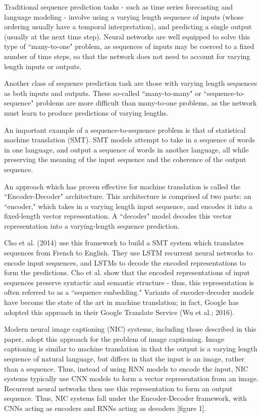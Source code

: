 \documentclass[letterpaper, 10 pt, conference]{ieeeconf}
\begin{document}
Traditional sequence prediction tasks - such as time series forecasting and language modeling - involve using a varying length sequence of inputs (whose ordering usually have a temporal interpretation), and predicting a single output (usually at the next time step). Neural networks are well equipped to solve this type of ``many-to-one" problem, as sequences of inputs may be coerced to a fixed number of time steps, so that the network does not need to account for varying length inputs or outputs.

Another class of sequence prediction task are those with varying length sequences as both inputs and outputs. These so-called ``many-to-many" or ``sequence-to-sequence" problems are more difficult than many-to-one problems, as the network must learn to produce predictions of varying lengths.

An important example of a sequence-to-sequence problem is that of statistical machine translation (SMT). SMT models attempt to take in a sequence of words in one language, and output a sequence of words in another language, all while preserving the meaning of the input sequence and the coherence of the output sequence.


An approach which has proven effective for machine translation is called the ``Encoder-Decoder" architecture. This architecture is comprised of two parts: an ``encoder," which takes in a varying length input sequence, and encodes it into a fixed-length vector representation. A ``decoder" model decodes this vector representation into a varying-length sequence prediction. 

Cho et al. (2014) use this framework to build a SMT system which translates sequences from French to English. They use LSTM recurrent neural networks to encode input sequences, and LSTMs to decode the encoded representations to form the predictions. Cho et al. show that the encoded representations of input sequences preserve syntactic and semantic structure - thus, this representation is often referred to as a ``sequence embedding." Variants of encoder-decoder models have become the state of the art in machine translation; in fact, Google has adopted this approach in their Google Translate Service (Wu et al.; 2016).

Modern neural image captioning (NIC) systems, including those described in this paper, adopt this approach for the problem of image captioning. Image captioning is similar to machine translation in that the output is a varying length sequence of natural language, but differs in that the input is an image, rather than a sequence. Thus, instead of using RNN models to encode the input, NIC systems typically use CNN models to form a vector representation from an image. Recurrent neural networks then use this representation to form an output sequence. Thus, NIC systems fall under the Encoder-Decoder framework, with CNNs acting as encoders and RNNs acting as decoders [figure 1]. 
\end{document}
